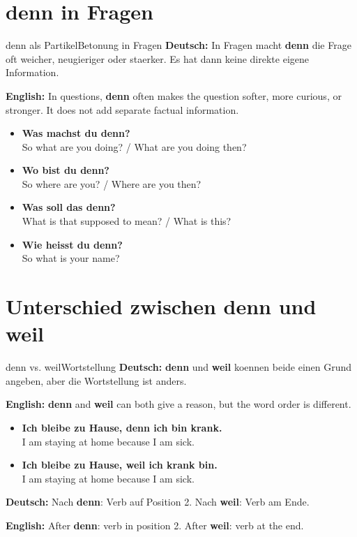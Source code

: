 \documentclass[a4paper,11pt]{article}
\newcommand{\GermanText}[1]{\textbf{Deutsch: }#1\par}
\newcommand{\EnglishText}[1]{{\small\color{SoftGray}\textbf{English: }#1\par}}
\newcommand{\ExampleItem}[2]{\item \textbf{#1}\\{\small\color{SoftGray}#2}}
\begin{document}
\section{denn in Fragen}

\begin{grammarentry}{denn als Partikel}{Betonung in Fragen}
\GermanText{In Fragen macht \textbf{denn} die Frage oft weicher, neugieriger oder staerker. Es hat dann keine direkte eigene Information.}
\EnglishText{In questions, \textbf{denn} often makes the question softer, more curious, or stronger. It does not add separate factual information.}

\begin{exbox}
\begin{itemize}
    \ExampleItem{Was machst du denn?}{So what are you doing? / What are you doing then?}
    \ExampleItem{Wo bist du denn?}{So where are you? / Where are you then?}
    \ExampleItem{Was soll das denn?}{What is that supposed to mean? / What is this?}
    \ExampleItem{Wie heisst du denn?}{So what is your name?}
\end{itemize}
\end{exbox}
\end{grammarentry}

\section{Unterschied zwischen denn und weil}

\begin{grammarentry}{denn vs. weil}{Wortstellung}
\GermanText{\textbf{denn} und \textbf{weil} koennen beide einen Grund angeben, aber die Wortstellung ist anders.}
\EnglishText{\textbf{denn} and \textbf{weil} can both give a reason, but the word order is different.}

\begin{exbox}
\begin{itemize}
    \ExampleItem{Ich bleibe zu Hause, denn ich \textbf{bin} krank.}{I am staying at home because I am sick.}
    \ExampleItem{Ich bleibe zu Hause, weil ich krank \textbf{bin}.}{I am staying at home because I am sick.}
\end{itemize}
\end{exbox}

\GermanText{Nach \textbf{denn}: Verb auf Position 2. Nach \textbf{weil}: Verb am Ende.}
\EnglishText{After \textbf{denn}: verb in position 2. After \textbf{weil}: verb at the end.}
\end{grammarentry}
\end{document}
